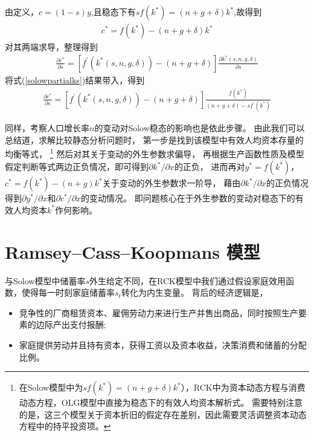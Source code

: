 \documentclass[cn,normal,11pt,black]{elegantnote}
\begin{document}
\begin{enumerate}
                由定义，$c=(1-s)y$,且稳态下有$sf(k^*) = (n+g+\delta)k^*$,故得到
                    \begin{align}
                        c^{*} = f\left(k^{*}\right)-(n+g+\delta) k^{*}
                    \end{align}
                对其两端求导，整理得到
                    \begin{align}
                        \frac{\partial c^{*}}{\partial s} = 
                            \left[f^{\prime}\left(k^{*}(s, n, g, \delta)\right)-(n+g+\delta)\right] 
                            \frac{\partial k^{*}(s, n, g, \delta)}{\partial s}
                    \end{align}
                将式(\ref{solowpartialks})结果带入，得到
                \begin{align}
                        \frac{\partial c^{*}}{\partial s} = 
                            \left[f^{\prime}\left(k^{*}(s, n, g, \delta)\right)-(n+g+\delta)\right] 
                            \frac{f\left(k^{*}\right)}{(n+g+\delta)-s f^{\prime}\left(k^{*}\right)}
                    \end{align}
    \end{enumerate}

    同样，考察人口增长率$n$的变动对Solow稳态的影响也是依此步骤。
    由此我们可以总结道，求解比较静态分析问题时，
    第一步是找到该模型中有效人均资本存量的均衡等式，
    \footnote{在Solow模型中为$sf(k^*) = (n+g+\delta)k^*$），RCK中为资本动态方程与消费动态方程，OLG模型中直接为稳态下的有效人均资本解析式。
        需要特别注意的是，这三个模型关于资本折旧的假定存在差别，因此需要灵活调整资本动态方程中的持平投资项。}
    然后对其关于变动的外生参数求偏导，
    再根据生产函数性质及模型假定判断等式两边正负情况，即可得到$\partial k^* / \partial x$的正负，
    进而再对$y^* = f(k^*)$，$c^* = f(k^*) - (n+g)k^*$关于变动的外生参数求一阶导，
    藉由$\partial k^* / \partial x$的正负情况得到$\partial y^*/\partial x$和$\partial c^*/\partial x$的变动情况。
    即问题核心在于外生参数的变动对稳态下的有效人均资本$k^*$作何影响。



\section{Ramsey–Cass–Koopmans 模型}


与Solow模型中储蓄率$s$外生给定不同，在RCK模型中我们通过假设家庭效用函数，使得每一时刻家庭储蓄率$s_t$转化为内生变量。
背后的经济逻辑是，
\begin{itemize}
    \item 竞争性的厂商租赁资本、雇佣劳动力来进行生产并售出商品，同时按照生产要素的边际产出支付报酬;
    \item 家庭提供劳动并且持有资本，获得工资以及资本收益，决策消费和储蓄的分配比例。
\end{itemize}
\end{document}
